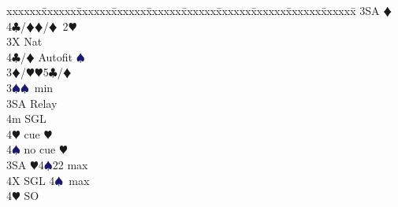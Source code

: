 \documentclass[a4paper,italian]{article}
\newcommand{\BC}{\textcolor{OliveGreen}{$\clubsuit$}}
\newcommand{\BD}{\textcolor{RedOrange}{$\vardiamondsuit$}}
\newcommand{\BH}{\textcolor{Red2}{$\varheartsuit${}}}
\newcommand{\BS}{\textcolor{MidnightBlue}{$\spadesuit${}}}
\newenvironment{bidtable}
{\begin{tabbing}

    xxxxxx\=xxxxxx\=xxxxxx\=xxxxxx\=xxxxxx\=xxxxxx\=xxxxxx\=xxxxxx\=xxxxxx\=xxxxxx\=\kill}
{\end{tabbing} }%
\begin{document}
\begin{multicols}{2}
\begin{bidtable}
                                            3SA \BD \\
                                            4\BC/\BD {}\BD /\BD\ 2\BH \-\-\\
                                            3X \> Nat\\
                                            4\BC/\BD \> Autofit \BS \-\\
                                            3\BD/\BH {}\BH 5\BC /\BD \\
                                            3\BS {}\BS\ min\+\\
                                            3SA \> Relay\+\\
                                            4m \> SGL\\
                                            4\BH {} cue \BH \\
                                            4\BS {} no cue \BH \-\-\\
                                            3SA \BH 4\BS 22 max\\
                                            4X \> SGL 4\BS\ max\\
                                            4\BH \> SO
                                        \end{bidtable}
                                    \end{multicols}
\end{document}
